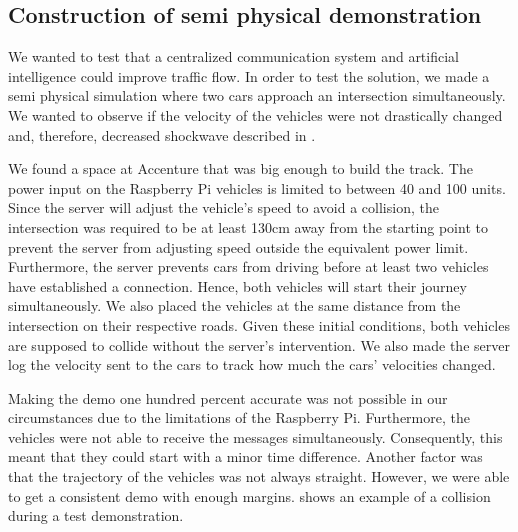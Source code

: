 \subsection{Construction of semi physical demonstration}\label{sec:demo}
We wanted to test that a centralized communication system and artificial intelligence could improve traffic flow. In order to test the solution, we made a semi physical simulation where two cars approach an intersection simultaneously. We wanted to observe if the velocity of the vehicles were not drastically changed and, therefore, decreased shockwave described in .

We found a space at Accenture that was big enough to build the track. The power input on the Raspberry Pi vehicles is limited to between 40 and 100 units. Since the server will adjust the vehicle's speed to avoid a collision, the intersection was required to be at least 130cm away from the starting point to prevent the server from adjusting speed outside the equivalent power limit. Furthermore, the server prevents cars from driving before at least two vehicles have established a connection. Hence, both vehicles will start their journey simultaneously. We also placed the vehicles at the same distance from the intersection on their respective roads. Given these initial conditions, both vehicles are supposed to collide without the server's intervention. We also made the server log the velocity sent to the cars to track how much the cars' velocities changed.

Making the demo one hundred percent accurate was not possible in our circumstances due to the limitations of the Raspberry Pi. Furthermore, the vehicles were not able to receive the messages simultaneously. Consequently, this meant that they could start with a minor time difference. Another factor was that the trajectory of the vehicles was not always straight. However, we were able to get a consistent demo with enough margins.  shows an example of a collision during a test demonstration.

